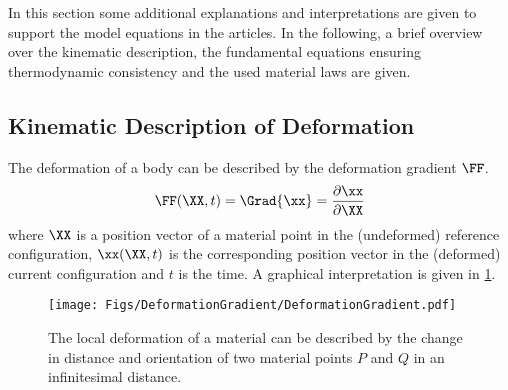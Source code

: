 In this section some additional explanations and interpretations are given to support the model equations in the articles. In the following, a brief overview over the kinematic description, the fundamental equations ensuring thermodynamic consistency and the used material laws are given. 
\subsection{Kinematic Description of Deformation}
The deformation of a body can be described by the deformation gradient $\FF$.  
\begin{align}
  \FF(\XX,t) = \Grad{\xx} = \frac{\partial \xx}{\partial \XX} 
\end{align}
where $\XX$ is a position vector of a material point in the (undeformed) reference configuration, $\xx(\XX,t)$ is the corresponding position vector in the (deformed) current configuration and $t$ is the time. A graphical interpretation is given in \cref{fig:DeformationGradient}. \\
\begin{figure}[h!]
  \centering
  \texttt{[image: Figs/DeformationGradient/DeformationGradient.pdf]}
  \caption{The local deformation of a material can be described by the change in distance and orientation of two material points $P$ and $Q$ in an infinitesimal distance. }
  \label{fig:DeformationGradient}
\end{figure}

